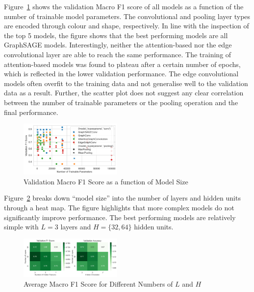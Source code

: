 \documentclass[10pt,conference,compsocconf]{IEEEtran}
\begin{document}
Figure~\ref{fig:scatter-val-f1} shows the validation Macro F1 score of all
models as a function of the number of trainable model parameters. The
convolutional and pooling layer types are encoded through colour and shape,
respectively. In line with the inspection of the top 5 models, the figure shows
that the best performing models are all GraphSAGE models. Interestingly, neither
the attention-based nor the edge convolutional layer are able to reach the same
performance. The training of attention-based models was found to plateau after a
certain number of epochs, which is reflected in the lower validation
performance. The edge convolutional models often overfit to the training data
and not generalise well to the validation data as a result. Further, the
scatter plot does not suggest any clear correlation between the number of
trainable parameters or the pooling operation and the final performance.

\begin{figure}[ht]
  \centering
  \includegraphics[width=0.45\textwidth]{../plots/scatter-val-f1.png}
  \caption{Validation Macro F1 Score as a function of Model Size}
  \label{fig:scatter-val-f1}
\end{figure}

Figure~\ref{fig:perf_vs_layers} breaks down ``model size'' into the number of
layers and hidden units through a heat map. The figure highlights that more
complex models do not significantly improve performance. The best performing
models are relatively simple with $L=3$ layers and $H=\{32, 64\}$ hidden units.

\begin{figure}[ht]
  \centering
  \includegraphics[width=0.45\textwidth]{../plots/heat-val-f1-acc.png}
  \caption{Average Macro F1 Score for Different Numbers of $L$ and $H$}
  \label{fig:perf_vs_layers}
\end{figure}
\end{document}
